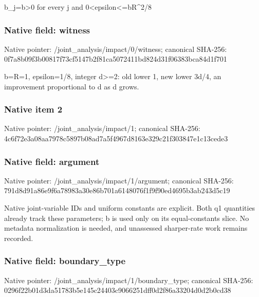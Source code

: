 \documentclass[10pt,a4paper]{article}
\begin{document}
\begingroup\raggedright\sloppy b\_\allowbreak{}j=\allowbreak{}b>0 for every j and 0<epsilon<=\allowbreak{}bR\textasciicircum{}2/\allowbreak{}8\par\endgroup

\subsubsection{Native field: witness}
Native pointer: /joint\_\allowbreak{}analysis/impact/0/witness; canonical SHA-256: 0f7a8b09f3b00817f73cf5147b2f81ca5072411bd824d31f06383bca84d1f701

\begingroup\raggedright\sloppy b=\allowbreak{}R=\allowbreak{}1,\allowbreak{} epsilon=\allowbreak{}1/\allowbreak{}8,\allowbreak{} integer d>=\allowbreak{}2:\allowbreak{} old lower 1,\allowbreak{} new lower 3d/\allowbreak{}4,\allowbreak{} an improvement proportional to d as d grows.\par\endgroup

\subsubsection{Native item 2}
Native pointer: /joint\_\allowbreak{}analysis/impact/1; canonical SHA-256: 4c6f72e3a08aa7978c5897b08ad7a5f4967d8163e329c21f303847e1c13cede3

\subsubsection{Native field: argument}
Native pointer: /joint\_\allowbreak{}analysis/impact/1/argument; canonical SHA-256: 791d8d91a86e9f6a78983a30e86b701a6148076f1f9f90ed4695b3ab243d5c19

\begingroup\raggedright\sloppy Native joint-variable IDs and uniform constants are explicit. Both q1 quantities already track these parameters;\allowbreak{} b is used only on its equal-constants slice. No metadata normalization is needed,\allowbreak{} and unassessed sharper-rate work remains recorded.\par\endgroup

\subsubsection{Native field: boundary\_\allowbreak{}type}
Native pointer: /joint\_\allowbreak{}analysis/impact/1/boundary\_\allowbreak{}type; canonical SHA-256: 0296f22b01d3da51783b5e145c24403c9066251dff0d2f86a33204d0d2b0cd38
\end{document}
